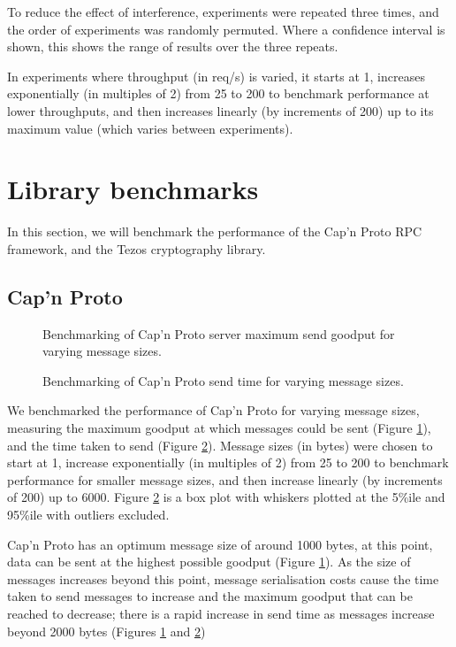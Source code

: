 To reduce the effect of interference, experiments were repeated three times, and the order of experiments was randomly permuted. Where a confidence interval is shown, this shows the range of results over the three repeats.

In experiments where throughput (in req/s) is varied, it starts at 1, increases exponentially (in multiples of 2) from 25 to 200 to benchmark performance at lower throughputs, and then increases linearly (by increments of 200) up to its maximum value (which varies between experiments).

\section{Library benchmarks} \label{librarybenchmarks}
In this section, we will benchmark the performance of the Cap'n Proto RPC framework, and the Tezos cryptography library.

\subsection{Cap'n Proto} \label{capnpbenchmark}

\begin{figure}[h!]
\centering
\resizebox{.6\textwidth}{!}{}
\caption{Benchmarking of Cap'n Proto server maximum send goodput for varying message sizes.}
\label{sizegoodput}
\end{figure}

\begin{figure}[h!]
\centering
\resizebox{.6\textwidth}{!}{}
\caption{Benchmarking of Cap'n Proto send time for varying message sizes.}
\label{sizesendtime}
\end{figure}

We benchmarked the performance of Cap'n Proto \cite{capnp} for varying message sizes, measuring the maximum goodput at which messages could be sent (Figure \ref{sizegoodput}), and the time taken to send (Figure \ref{sizesendtime}). Message sizes (in bytes) were chosen to start at 1, increase exponentially (in multiples of 2) from 25 to 200 to benchmark performance for smaller message sizes, and then increase linearly (by increments of 200) up to 6000. Figure \ref{sizesendtime} is a box plot with whiskers plotted at the 5\%ile and 95\%ile with outliers excluded.

Cap'n Proto has an optimum message size of around 1000 bytes, at this point, data can be sent at the highest possible goodput (Figure \ref{sizegoodput}). As the size of messages increases beyond this point, message serialisation costs cause the time taken to send messages to increase and the maximum goodput that can be reached to decrease; there is a rapid increase in send time as messages increase beyond 2000 bytes (Figures \ref{sizegoodput} and \ref{sizesendtime})

